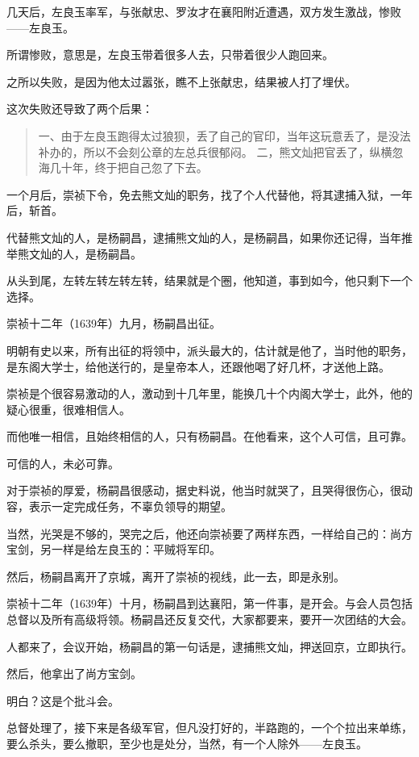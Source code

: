 \begin{multicols}{\theparacolNo}
几天后，左良玉率军，与张献忠、罗汝才在襄阳附近遭遇，双方发生激战，惨败——左良玉。

所谓惨败，意思是，左良玉带着很多人去，只带着很少人跑回来。

之所以失败，是因为他太过嚣张，瞧不上张献忠，结果被人打了埋伏。

这次失败还导致了两个后果：
{\footnotesize \begin{quote}
	一、由于左良玉跑得太过狼狈，丢了自己的官印，当年这玩意丢了，是没法补办的，所以不会刻公章的左总兵很郁闷。
	二，熊文灿把官丢了，纵横忽海几十年，终于把自己忽了下去。
\end{quote}}

一个月后，崇祯下令，免去熊文灿的职务，找了个人代替他，将其逮捕入狱，一年后，斩首。

代替熊文灿的人，是杨嗣昌，逮捕熊文灿的人，是杨嗣昌，如果你还记得，当年推举熊文灿的人，是杨嗣昌。

从头到尾，左转左转左转左转，结果就是个圈，他知道，事到如今，他只剩下一个选择。

崇祯十二年（1639年）九月，杨嗣昌出征。

明朝有史以来，所有出征的将领中，派头最大的，估计就是他了，当时他的职务，是东阁大学士，给他送行的，是皇帝本人，还跟他喝了好几杯，才送他上路。

崇祯是个很容易激动的人，激动到十几年里，能换几十个内阁大学士，此外，他的疑心很重，很难相信人。

而他唯一相信，且始终相信的人，只有杨嗣昌。在他看来，这个人可信，且可靠。

可信的人，未必可靠。

对于崇祯的厚爱，杨嗣昌很感动，据史料说，他当时就哭了，且哭得很伤心，很动容，表示一定完成任务，不辜负领导的期望。

当然，光哭是不够的，哭完之后，他还向崇祯要了两样东西，一样给自己的：尚方宝剑，另一样是给左良玉的：平贼将军印。

然后，杨嗣昌离开了京城，离开了崇祯的视线，此一去，即是永别。

崇祯十二年（1639年）十月，杨嗣昌到达襄阳，第一件事，是开会。与会人员包括总督以及所有高级将领。杨嗣昌还反复交代，大家都要来，要开一次团结的大会。

人都来了，会议开始，杨嗣昌的第一句话是，逮捕熊文灿，押送回京，立即执行。

然后，他拿出了尚方宝剑。

明白？这是个批斗会。

总督处理了，接下来是各级军官，但凡没打好的，半路跑的，一个个拉出来单练，要么杀头，要么撤职，至少也是处分，当然，有一个人除外——左良玉。


\end{multicols}
